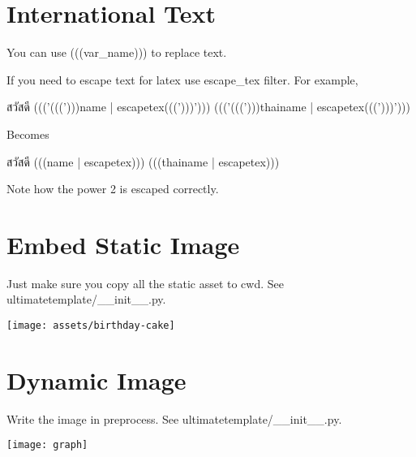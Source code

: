 \documentclass[12pt]{article}
\begin{document}
\section{International Text}

You can use (((var_name))) to replace text.

If you need to escape text for latex use escape\_tex filter. For example,

สวัสดี ((('(((')))name | escapetex(((')))'))) ((('(((')))thainame | escapetex(((')))')))

Becomes

สวัสดี (((name | escapetex))) (((thainame | escapetex)))


Note how the power 2 is escaped correctly.

\section{Embed Static Image}

Just make sure you copy all the static asset to cwd. See ultimatetemplate/\_\_init\_\_.py.

\begin{center}
\texttt{[image: assets/birthday-cake]}
\end{center}

\section{Dynamic Image}

Write the image in preprocess. See ultimatetemplate/\_\_init\_\_.py.

\begin{center}
	\texttt{[image: graph]}
\end{center}
\end{document}
